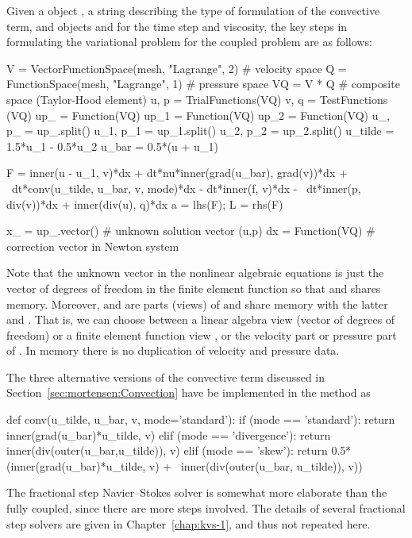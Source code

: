 Given a  object , a string  describing
the type of formulation of the convective term, and 
objects  and  for the time step and viscosity, the key
steps in formulating the variational problem for the coupled problem
are as follows:
\begin{python}
V = VectorFunctionSpace(mesh, "Lagrange", 2)  # velocity space
Q = FunctionSpace(mesh, "Lagrange", 1)        # pressure space
VQ = V * Q  # composite space (Taylor-Hood element)
u, p = TrialFunctions(VQ)
v, q = TestFunctions (VQ)
up_  = Function(VQ)
up_1 = Function(VQ)
up_2 = Function(VQ)
u_, p_ = up_.split()
u_1, p_1 = up_1.split()
u_2, p_2 = up_2.split()
u_tilde = 1.5*u_1 - 0.5*u_2
u_bar = 0.5*(u + u_1)

F  = inner(u - u_1, v)*dx + dt*nu*inner(grad(u_bar), grad(v))*dx + \
     dt*conv(u_tilde, u_bar, v, mode)*dx - dt*inner(f, v)*dx - \
     dt*inner(p, div(v))*dx + inner(div(u), q)*dx
a = lhs(F); L = rhs(F)

x_ = up_.vector()  # unknown solution vector (u,p)
dx = Function(VQ)  # correction vector in Newton system
\end{python}
Note that the unknown vector  in the nonlinear algebraic
equations is just the vector of degrees of freedom in the 
finite element function so that \emp{up\_} and  shares
memory. Moreover, \emp{u\_} and \emp{p\_} are parts (views) of
 and share memory with the latter and \emp{x\_}.  That is,
we can choose between a linear algebra view \emp{x\_} (vector of
degrees of freedom) or a finite element function view , or
the velocity part \emp{u\_} or pressure part \emp{p\_} of \emp{up\_}.
In memory there is no duplication of velocity and pressure data.

The three alternative versions of the convective term discussed in
Section~\ref{sec:mortensen:Convection} have be implemented in the method
\emp{conv} as
\begin{python}
def conv(u_tilde, u_bar, v, mode='standard'):
    if (mode == 'standard'):
        return inner(grad(u_bar)*u_tilde, v)
    elif (mode == 'divergence'):
        return inner(div(outer(u_bar,u_tilde)), v)
    elif (mode == 'skew'):
        return 0.5*(inner(grad(u_bar)*u_tilde, v) + \
        inner(div(outer(u_bar, u_tilde)), v))
\end{python}
The fractional step Navier--Stokes solver is somewhat more elaborate
than the fully coupled, since there are more steps involved. The
details of several fractional step solvers are given in
Chapter~\ref{chap:kvs-1}, and thus not repeated here.


